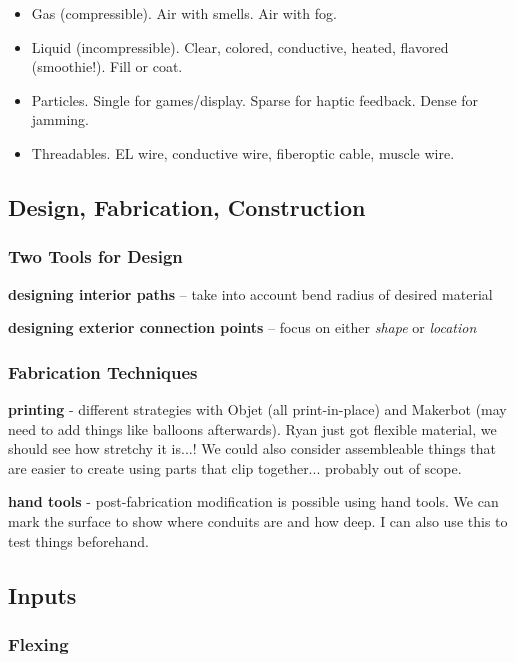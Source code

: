 \begin{itemize}
\item Gas (compressible).  Air with smells.  Air with fog.
\item Liquid (incompressible).  Clear, colored, conductive, heated, flavored (smoothie!).  Fill or coat.
\item Particles.  Single for games/display.  Sparse for haptic feedback.  Dense for jamming.
\item Threadables.  EL wire, conductive wire, fiberoptic cable, muscle wire.
\end{itemize}

\subsection{Design, Fabrication, Construction}

\subsubsection{Two Tools for Design}

\textbf{designing interior paths} -- take into account bend radius of desired material

\textbf{designing exterior connection points} -- focus on either \emph{shape} or \emph{location}

\subsubsection{Fabrication Techniques}

\textbf{printing} - different strategies with Objet (all print-in-place) and Makerbot (may need to add things like balloons afterwards).  Ryan just got flexible material, we should see how stretchy it is...!  We could also consider assembleable things that are easier to create using parts that clip together... probably out of scope.

\textbf{hand tools} - post-fabrication modification is possible using hand tools.  We can mark the surface to show where conduits are and how deep.  I can also use this to test things beforehand.

\subsection{Inputs}

\subsubsection{Flexing}

